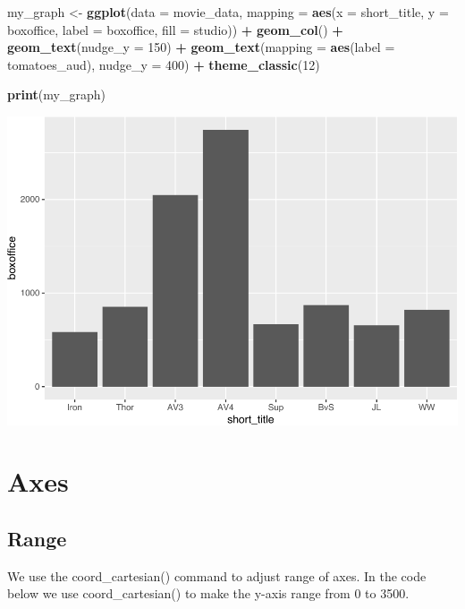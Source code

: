 \documentclass[
]{krantz}
\makeatletter
\newenvironment{Shaded}{\begin{snugshade}}{\end{snugshade}}
\newcommand{\DataTypeTok}[1]{\textcolor[rgb]{0.27,0.27,0.27}{#1}}
\newcommand{\DecValTok}[1]{\textcolor[rgb]{0.06,0.06,0.06}{#1}}
\newcommand{\KeywordTok}[1]{\textcolor[rgb]{0.27,0.27,0.27}{\textbf{#1}}}
\newcommand{\NormalTok}[1]{#1}
\newcommand{\OperatorTok}[1]{\textcolor[rgb]{0.43,0.43,0.43}{\textbf{#1}}}
\newcommand{\StringTok}[1]{\textcolor[rgb]{0.5,0.5,0.5}{#1}}
\newenvironment{kframe}{%
\medskip{}
\setlength{\fboxsep}{.8em}
 \def\at@end@of@kframe{}%
 \ifinner\ifhmode%
  \def\at@end@of@kframe{\end{minipage}}%
  \begin{minipage}{\columnwidth}%
 \fi\fi%
 \def\FrameCommand##1{\hskip\@totalleftmargin \hskip-\fboxsep
 \colorbox{shadecolor}{##1}\hskip-\fboxsep
     \hskip-\linewidth \hskip-\@totalleftmargin \hskip\columnwidth}%
 \MakeFramed {\advance\hsize-\width
   \@totalleftmargin\z@ \linewidth\hsize
   \@setminipage}}%
 {\par\unskip\endMakeFramed%
 \at@end@of@kframe}
\renewenvironment{Shaded}{\begin{kframe}}{\end{kframe}}
\makeatother
\begin{document}
\begin{Shaded}
\begin{Highlighting}[]
\NormalTok{my_graph <-}\StringTok{ }\KeywordTok{ggplot}\NormalTok{(}\DataTypeTok{data =}\NormalTok{ movie_data,}
           \DataTypeTok{mapping =} \KeywordTok{aes}\NormalTok{(}\DataTypeTok{x =}\NormalTok{ short_title,}
                         \DataTypeTok{y =}\NormalTok{ boxoffice,}
                         \DataTypeTok{label =}\NormalTok{ boxoffice, }
                         \DataTypeTok{fill =}\NormalTok{ studio)) }\OperatorTok{+}
\StringTok{  }\KeywordTok{geom_col}\NormalTok{() }\OperatorTok{+}
\StringTok{  }\KeywordTok{geom_text}\NormalTok{(}\DataTypeTok{nudge_y =} \DecValTok{150}\NormalTok{)  }\OperatorTok{+}
\StringTok{  }\KeywordTok{geom_text}\NormalTok{(}\DataTypeTok{mapping =} \KeywordTok{aes}\NormalTok{(}\DataTypeTok{label =}\NormalTok{ tomatoes_aud), }
            \DataTypeTok{nudge_y =} \DecValTok{400}\NormalTok{) }\OperatorTok{+}
\StringTok{  }\KeywordTok{theme_classic}\NormalTok{(}\DecValTok{12}\NormalTok{)}

\KeywordTok{print}\NormalTok{(my_graph)}
\end{Highlighting}
\end{Shaded}

\includegraphics[width=0.65\linewidth]{bookdown_files/figure-latex/unnamed-chunk-259-1}

\hypertarget{axes}{%
\section{Axes}\label{axes}}

\hypertarget{range}{%
\subsection{Range}\label{range}}

We use the coord\_cartesian() command to adjust range of axes. In the code below we use coord\_cartesian() to make the y-axis range from 0 to 3500.
\end{document}
